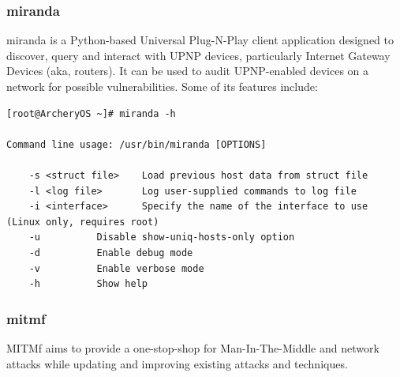 \documentclass{article}
\begin{document}
\subsubsection{miranda}
miranda is a Python-based Universal Plug-N-Play client application designed to discover, query and interact with UPNP devices, particularly Internet Gateway Devices (aka, routers). It can be used to audit UPNP-enabled devices on a network for possible vulnerabilities. Some of its features include:
\begin{lstlisting}
[root@ArcheryOS ~]# miranda -h

Command line usage: /usr/bin/miranda [OPTIONS]
	
	-s <struct file>	Load previous host data from struct file
	-l <log file>		Log user-supplied commands to log file
	-i <interface>		Specify the name of the interface to use (Linux only, requires root)
	-u			Disable show-uniq-hosts-only option
	-d			Enable debug mode
	-v			Enable verbose mode
	-h 			Show help
\end{lstlisting}

\subsubsection{mitmf}
MITMf aims to provide a one-stop-shop for Man-In-The-Middle and network attacks while updating and improving existing attacks and techniques.
\end{document}
